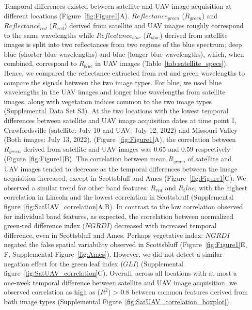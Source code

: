 \documentclass[12pt,twoside]{gsag3jnl}
\begin{document}
Temporal differences existed between satellite and UAV image acquisition at different locations (Figure~\ref{fig:Figure1}A). $Reflectance_{green}$ ($R_{green}$) and $Reflectance_{red}$ ($R_{red}$) derived from satellite and UAV images roughly correspond to the same wavelengths while $Reflectance_{blue}$ ($R_{blue}$) derived from satellite images is split into two reflectances from two regions of the blue spectrum; deep blue (shorter blue wavelengths) and blue (longer blue wavelengths), which, when combined, correspond to $R_{blue}$ in UAV images (Table~\ref{tab:satellite_specs}). Hence, we compared the reflectance extracted from red and green wavelengths to compare the signals between the two image types. For blue, we used blue wavelengths in the UAV images and longer blue wavelengths from satellite images, along with vegetation indices common to the two image types (Supplemental Data Set S3). At the two locations with the lowest temporal differences between satellite and UAV image acquisition dates at time point 1, Crawfordsville (satellite: July 10 and UAV: July 12, 2022) and Missouri Valley (Both images: July 13, 2022), (Figure~\ref{fig:Figure1}A), the correlation between $R_{green}$ derived from satellite and UAV images was 0.65 and 0.59 respectively (Figure~\ref{fig:Figure1}B). The correlation between mean $R_{green}$ of satellite and UAV images tended to decrease as the temporal differences between the image acquisition increased, except in Scottsbluff and Ames (Figure~\ref{fig:Figure1}C). We observed a similar trend for other band features: $R_{red}$ and $R_blue$, with the highest correlation in Lincoln and the lowest correlation in Scottsbluff (Supplemental figure~\ref{fig:SatUAV_correlation}A,B). In contrast to the low correlation observed for individual band features, as expected, the correlation between normalized green-red difference index ($NGRDI$) decreased with increased temporal difference, even in Scottsbluff and Ames. Perhaps vegetative index: $NGRDI$ negated the false spatial variability observed in Scottsbluff (Figure~\ref{fig:Figure1}E, F, Supplemental Figure~\ref{fig:Ames}). However, we did not detect a similar negation effect for the green leaf index ($GLI$) (Supplemental figure~\ref{fig:SatUAV_correlation}C). Overall, across all locations with at most a one-week temporal difference between satellite and UAV image acquisition, we observed correlation as high as ($R^2$) > 0.8 between common features derived from both image types (Supplemental Figure~\ref{fig:SatUAV_correlation_boxplot}). 
\end{document}
